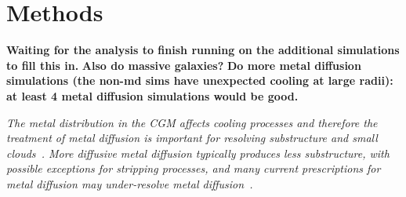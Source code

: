 \documentclass[fleqn,usenatbib]{mnras}
\begin{document}






\section{Methods}
\label{s: methods}

\textbf{Waiting for the analysis to finish running on the additional simulations to fill this in.}
\textbf{Also do massive galaxies?}
\textbf{Do more metal diffusion simulations (the non-md sims have unexpected cooling at large radii): at least 4 metal diffusion simulations would be good.}

\textit{
The metal distribution in the CGM affects cooling processes and therefore the treatment of metal diffusion is important for resolving substructure and small clouds~\cite{rennehan2021}.
More diffusive metal diffusion typically produces less substructure, with possible exceptions for stripping processes, and many current prescriptions for metal diffusion may under-resolve metal diffusion~\citep[e.g.][]{rennehan2019, rennehan2021}.
}
\end{document}

